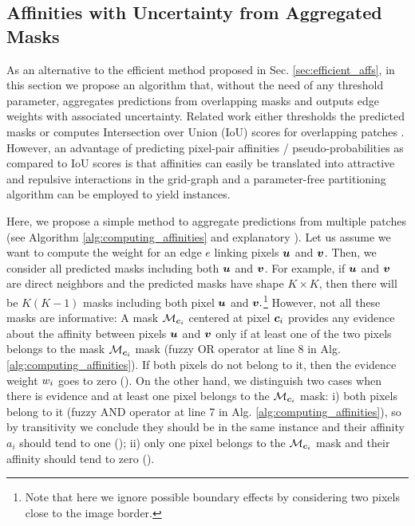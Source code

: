 \subsection{Affinities with Uncertainty from Aggregated Masks}\label{sec:aggr_affs}
As an alternative to the efficient method proposed in Sec. \ref{sec:efficient_affs}, in this section we propose an algorithm that, without the need of any threshold parameter, aggregates predictions from overlapping \maskname masks and outputs edge weights with associated uncertainty.
Related work either thresholds the predicted \maskname masks \cite{januszewski2018high,hirsch2020patchperpix,meirovitch2016multi} or computes Intersection over Union (IoU) scores for overlapping patches \cite{liu2016multi}. However, an advantage of predicting pixel-pair affinities / pseudo-probabilities as compared to IoU scores is that affinities can easily be translated into attractive and repulsive interactions in the grid-graph 
and a parameter-free partitioning algorithm can be employed to yield instances.

Here, we propose a simple method to aggregate predictions from multiple patches (see Algorithm \ref{alg:computing_affinities} and explanatory ). Let us assume we want to compute the weight for an edge $e$ linking pixels $\bm{u}$ and $\bm{v}$. Then, we consider all predicted \maskname masks including both $\bm{u}$ and $\bm{v}$. For example, if $\bm{u}$ and $\bm{v}$ are direct neighbors and the predicted masks have shape $K\times K$, then there will be $K(K-1)$ masks including both pixel $\bm{u}$ and $\bm{v}.$\footnote{Note that here we ignore possible boundary effects by considering two pixels close to the image border.} 
However, not all these masks are informative: A mask $\mathcal{M}_{\bm{c}_i}$ centered at pixel $\bm{c}_i$ provides any evidence about the affinity between pixels $\bm{u}$ and $\bm{v}$ only if at least one of the two pixels belongs to the mask $\mathcal{M}_{\bm{c}_i}$ mask (fuzzy OR operator at line 8 in Alg. \ref{alg:computing_affinities}).
If both pixels do not belong to it, then the evidence weight $w_i$ goes to zero ().
On the other hand, we distinguish two cases when there is evidence and at least one pixel belongs to the $\mathcal{M}_{\bm{c}_i}$ mask: i)
both pixels belong to it (fuzzy AND operator at line 7 in Alg. \ref{alg:computing_affinities}), so by transitivity we conclude they should be in the same instance and their affinity $a_i$ should tend to one (); 
ii) only one pixel belongs to the $\mathcal{M}_{\bm{c}_i}$ mask and their affinity should tend to zero (). 

